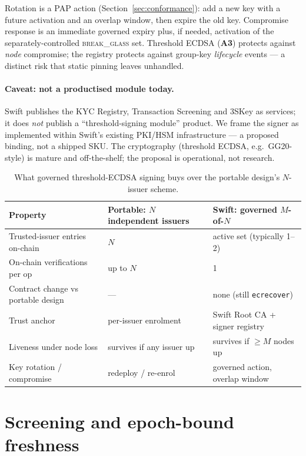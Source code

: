 \documentclass[11pt,a4paper]{article}
\newcommand{\Aref}[1]{\textbf{A#1}}
\begin{document}
Rotation is a PAP action (Section~\ref{sec:conformance}): add a new key with a
future activation and an overlap window, then expire the old key. Compromise
response is an immediate governed expiry plus, if needed, activation of the
separately-controlled \textsc{break\_glass} set. Threshold ECDSA (\Aref{3})
protects against \emph{node} compromise; the registry protects against
group-key \emph{lifecycle} events --- a distinct risk that static pinning leaves
unhandled.

\paragraph{Caveat: not a productised module today.} Swift publishes the KYC
Registry, Transaction Screening and 3SKey as services; it does \emph{not} publish
a ``threshold-signing module'' product. We frame the signer as implemented within
Swift's existing PKI/HSM infrastructure --- a proposed binding, not a shipped SKU.
The cryptography (threshold ECDSA, e.g.\ GG20-style) is mature and off-the-shelf;
the proposal is operational, not research.

\begin{table}[h]
\centering
\caption{What governed threshold-ECDSA signing buys over the portable design's
$N$-issuer scheme.}
\label{tab:tss}
\begin{tabularx}{\textwidth}{@{}p{4.6cm} L L@{}}
\toprule
\textbf{Property} & \textbf{Portable: $N$ independent issuers} & \textbf{Swift: governed $M$-of-$N$} \\
\midrule
Trusted-issuer entries on-chain & $N$ & active set (typically 1--2) \\
On-chain verifications per op & up to $N$ & 1 \\
Contract change vs portable design & --- & none (still \texttt{ecrecover}) \\
Trust anchor & per-issuer enrolment & Swift Root CA + signer registry \\
Liveness under node loss & survives if any issuer up & survives if $\ge M$ nodes up \\
Key rotation / compromise & redeploy / re-enrol & governed action, overlap window \\
\bottomrule
\end{tabularx}
\end{table}

\section{Screening and epoch-bound freshness}
\label{sec:freshness}
\end{document}
